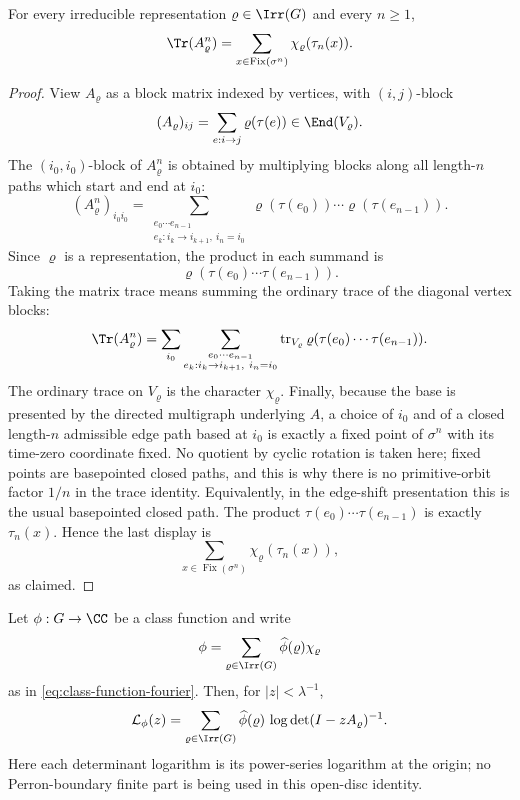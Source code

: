 \begin{lemma}
  \label{lem:twisted-trace-identity}
  For every irreducible representation \(\varrho\in\Irr(G)\) and every
  \(n\ge 1\),
  \[
    \Tr(A_\varrho^n)
    =
    \sum_{x\in\operatorname{Fix}(\sigma^n)}
      \chi_\varrho(\tau_n(x)).
  \]
\end{lemma}

\begin{proof}
  View \(A_\varrho\) as a block matrix indexed by vertices, with
  \((i,j)\)-block
  \[
    (A_\varrho)_{ij}=\sum_{e:i\to j}\varrho(\tau(e))
    \in\End(V_\varrho).
  \]
  The \((i_0,i_0)\)-block of \(A_\varrho^n\) is obtained by multiplying
  blocks along all length-\(n\) paths which start and end at \(i_0\):
  \[
    (A_\varrho^n)_{i_0i_0}
    =
    \sum_{\substack{e_0\cdots e_{n-1}\\
          e_k:i_k\to i_{k+1},\ i_n=i_0}}
      \varrho(\tau(e_0))\cdots\varrho(\tau(e_{n-1})).
  \]
  Since \(\varrho\) is a representation, the product in each summand is
  \[
    \varrho(\tau(e_0)\cdots\tau(e_{n-1})).
  \]
  Taking the matrix trace means summing the ordinary trace of the
  diagonal vertex blocks:
  \[
    \Tr(A_\varrho^n)
    =
    \sum_{i_0}
    \sum_{\substack{e_0\cdots e_{n-1}\\
          e_k:i_k\to i_{k+1},\ i_n=i_0}}
      \operatorname{tr}_{V_\varrho}
      \varrho(\tau(e_0)\cdots\tau(e_{n-1})).
  \]
  The ordinary trace on \(V_\varrho\) is the character
  \(\chi_\varrho\). Finally, because the base is presented by the
  directed multigraph underlying \(A\), a choice of \(i_0\) and of a closed
  length-\(n\) admissible edge path based at \(i_0\) is exactly a
  fixed point of \(\sigma^n\) with its time-zero coordinate fixed. No
  quotient by cyclic rotation is taken here; fixed points are
  basepointed closed paths, and this is why there is no primitive-orbit
  factor \(1/n\) in the trace identity. Equivalently, in the edge-shift
  presentation this is the usual basepointed closed path. The product
  \(\tau(e_0)\cdots\tau(e_{n-1})\) is exactly \(\tau_n(x)\). Hence the
  last display is
  \[
    \sum_{x\in\operatorname{Fix}(\sigma^n)}
      \chi_\varrho(\tau_n(x)),
  \]
  as claimed.
\end{proof}

\begin{theorem}
  \label{thm:class-function-linearisation}
  Let \(\phi:G\to\CC\) be a class function and write
  \[
    \phi=\sum_{\varrho\in\Irr(G)}\widehat\phi(\varrho)\chi_\varrho
  \]
  as in \eqref{eq:class-function-fourier}. Then, for \(|z|<\lambda^{-1}\),
  \begin{equation}\label{eq:class-logarithm-determinant-linearisation}
    \mathcal L_\phi(z)
    =
    \sum_{\varrho\in\Irr(G)}
      \widehat\phi(\varrho)\,
      \log\det(I-zA_\varrho)^{-1}.
  \end{equation}
  Here each determinant logarithm is its power-series logarithm at the origin;
  no Perron-boundary finite part is being used in this open-disc identity.
\end{theorem}

